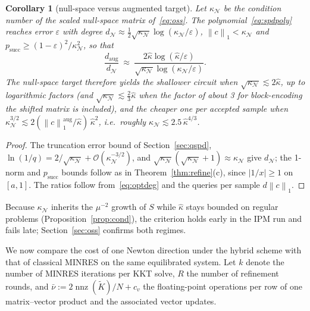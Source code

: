 \documentclass[11pt]{article}
\newtheorem{corollary}[theorem]{Corollary}
\theoremstyle{definition}
\newcommand{\norm}[1]{\left\lVert #1 \right\rVert}
\newcommand{\Kt}{\tilde K}
\newcommand{\kh}{\hat\kappa}
\newcommand{\eps}{\varepsilon}
\newcommand{\bigO}{\mathcal{O}}
\newcommand{\nnz}{\operatorname{nnz}}
\begin{document}
\begin{corollary}[null-space versus augmented target]\label{cor:oss}
Let $\kappa_{\mathcal N}$ be the condition number of the scaled null-space matrix of~\eqref{eq:oss}. The polynomial~\eqref{eq:spdpoly} reaches error $\eps$ with degree $d_{\mathcal N}\approx\tfrac12\sqrt{\kappa_{\mathcal N}}\log(\kappa_{\mathcal N}/\eps)$, $\norm{c}_1<\kappa_{\mathcal N}$ and $p_{\text{succ}}\ge(1-\eps)^2/\kappa_{\mathcal N}^2$, so that
\[
\frac{d_{\text{aug}}}{d_{\mathcal N}}\ \approx\ \frac{2\kh\log(\kh/\eps)}{\sqrt{\kappa_{\mathcal N}}\log(\kappa_{\mathcal N}/\eps)}.
\]
The null-space target therefore yields the shallower circuit when $\sqrt{\kappa_{\mathcal N}}\lesssim2\kh$, up to logarithmic factors (and $\sqrt{\kappa_{\mathcal N}}\lesssim\tfrac23\kh$ when the factor of about 3 for block-encoding the shifted matrix is included), and the cheaper one per accepted sample when $\kappa_{\mathcal N}^{3/2}\lesssim2(\norm{c}_1^{\text{aug}}/\kh)\,\kh^2$, i.e.\ roughly $\kappa_{\mathcal N}\lesssim2.5\,\kh^{4/3}$.
\end{corollary}
\begin{proof}
The truncation error bound of Section~\ref{sec:qspd}, $\ln(1/q)=2/\sqrt{\kappa_{\mathcal N}}+\bigO(\kappa_{\mathcal N}^{-3/2})$, and $\sqrt{\kappa_{\mathcal N}}(\sqrt{\kappa_{\mathcal N}}+1)\approx\kappa_{\mathcal N}$ give $d_{\mathcal N}$; the 1-norm and $p_{\text{succ}}$ bounds follow as in Theorem~\ref{thm:refine}(c), since $|1/x|\ge1$ on $[a,1]$. The ratios follow from~\eqref{eq:optdeg} and the queries per sample $d\norm{c}_1$.
\end{proof}
Because $\kappa_{\mathcal N}$ inherits the $\mu^{-2}$ growth of $S$ while $\kh$ stays bounded on regular problems (Proposition~\ref{prop:cond}), the criterion holds early in the IPM run and fails late; Section~\ref{sec:oss} confirms both regimes.

We now compare the cost of one Newton direction under the hybrid scheme with that of classical MINRES on the same equilibrated system. Let $k$ denote the number of MINRES iterations per KKT solve, $R$ the number of refinement rounds, and $\bar\nu:=2\nnz(\Kt)/N+c_v$ the floating-point operations per row of one matrix--vector product and the associated vector updates.
\end{document}
